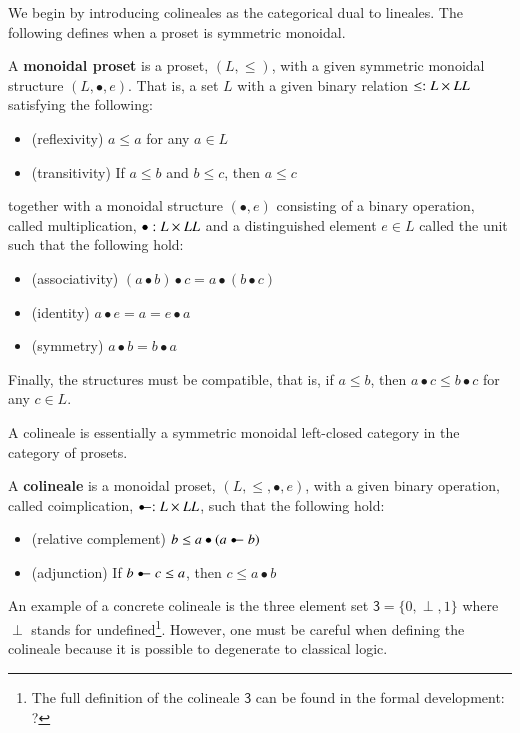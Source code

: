 \documentclass{llncs}
\let\to\relax
\newcommand{\to}{\rightarrow}
\newcommand{\colimp}[0]{\multimapdotinv}
\begin{document}
We begin by introducing colineales as the categorical dual to
lineales. The following defines when a proset is symmetric monoidal.
\begin{definition}
  \label{def:monoidal-proset}
  A \textbf{monoidal proset} is a proset, $(L, \leq)$, with a given
  symmetric monoidal structure $(L, \bullet, e)$.  That is, a set $L$
  with a given binary relation $\leq : L \times L \to L$ satisfying
  the following:
  \begin{itemize}
  \item (reflexivity) $a \leq a$ for any $a \in L$
  \item (transitivity) If $a \leq b$ and $b \leq c$, then $a \leq c$
  \end{itemize}
  together with a monoidal structure $(\bullet, e)$ consisting of a
  binary operation, called multiplication, $\bullet : L \times L \to L$
  and a distinguished element $e \in L$ called the unit such that the
  following hold:
  \begin{itemize}
  \item (associativity) $(a \bullet b) \bullet c = a \bullet (b \bullet c)$
  \item (identity) $a \bullet e = a = e \bullet a$
  \item (symmetry) $a \bullet b = b \bullet a$
  \end{itemize}
  Finally, the structures must be compatible, that is, if $a \leq b$,
  then $a \bullet c \leq b \bullet c$ for any $c \in L$.
\end{definition}
A colineale is essentially a symmetric monoidal left-closed
category in the category of prosets.
\begin{definition}
  \label{def:lineale}
  A \textbf{colineale} is a monoidal proset, $(L, \leq, \bullet, e)$, with
  a given binary operation, called coimplication, $\colimp : L \times L
  \to L$, such that the following hold:
  \begin{itemize}
  \item (relative complement) $b \leq a \bullet (a \colimp b)$
  \item (adjunction) If $b \colimp c \leq a$, then $c \leq a \bullet b$
  \end{itemize}
\end{definition}
An example of a concrete colineale is the three element set
$\mathsf{3} = \{0,\perp,1\}$ where $\perp$ stands for undefined\footnote{The full
  definition of the colineale $\mathsf{3}$ can be found in the formal
  development: ?}.  However, one must be careful when defining the
colineale because it is possible to degenerate to classical logic.


 
\end{document}
